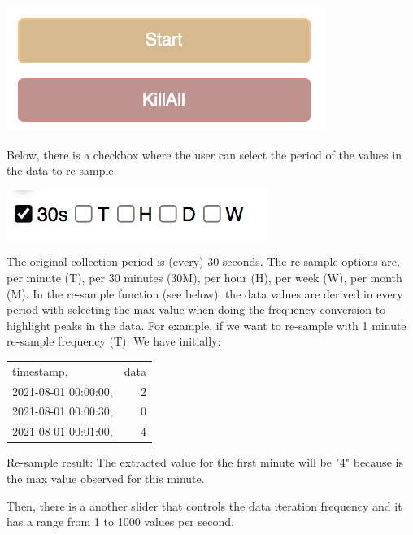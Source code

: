 \documentclass[11pt]{article}
\begin{document}
\begin{center}
\includegraphics[width=.9\linewidth]{./start_kill_buttons.png}
\end{center}

Below, there is a checkbox where the user can select the period of the values in the data to re-sample.

\begin{center}
\includegraphics[width=.9\linewidth]{./resample_checkbox.png}
\end{center}

The original collection period is (every) 30 seconds.  The re-sample options are, per minute (T), per 30 minutes (30M), per hour (H), per week (W), per month (M).  In the re-sample function (see below), the data values are derived in every period with selecting the max value when doing the frequency conversion to highlight peaks in the data.  For example, if we want to re-sample with 1 minute re-sample frequency (T). We have initially:
\begin{center}
\begin{tabular}{lr}
\hline
timestamp, & data\\
2021-08-01 00:00:00, & 2\\
2021-08-01 00:00:30, & 0\\
2021-08-01 00:01:00, & 4\\
\hline
\end{tabular}
\end{center}

Re-sample result: The extracted value for the first minute will be "4" because is the max value observed for this minute.

Then, there is a another slider that controls the data iteration frequency and it has a range from 1 to 1000 values per second.
\end{document}
